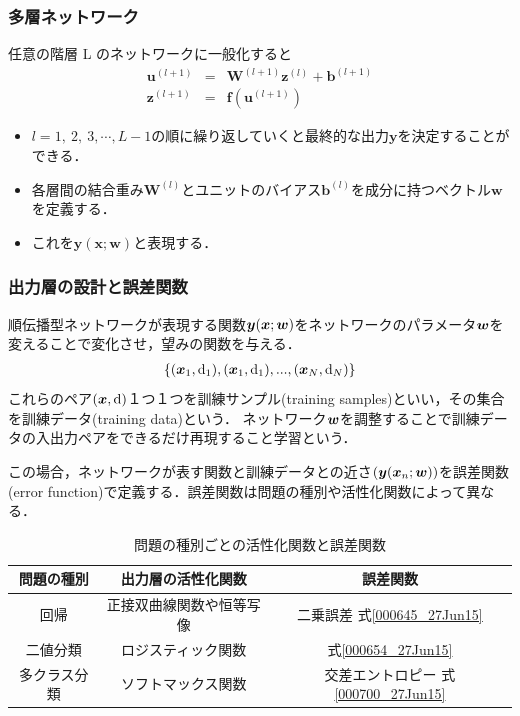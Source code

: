 \documentclass[dvipdfmx,11pt,notheorems]{beamer}
\theoremstyle{definition}
\def\vec#1{\mbox{\boldmath$#1$}}
\begin{document}

\begin{frame}[fragile]\frametitle{多層ネットワーク}

\begin{block}{任意の階層 L のネットワークに一般化すると}
\begin{eqnarray}
  \bm{u}^{(l+1)} &=& \bm{W}^{(l+1)}\bm{z}^{(l)} + \bm{b}^{(l+1)} \nonumber\\
  \bm{z}^{(l+1)} &=& \bm{f}(\bm{u}^{(l+1)}) \nonumber
\end{eqnarray}
\vspace{0.1mm}
\end{block}

\begin{itemize}
\item $l=1,\ 2,\ 3,\cdots, L-1$の順に繰り返していくと最終的な出力$\bm{y}$を決定することができる．
\item 各層間の結合重み$\bm{W}^{(l)}$とユニットのバイアス$\bm{b}^{(l)}$を成分に持つベクトル$\bm{w}$を定義する．\\
\item これを$\bm{y}(\bm{x};\bm{w})$と表現する．
\end{itemize}
\end{frame}


\begin{frame}[fragile]\frametitle{出力層の設計と誤差関数}

順伝播型ネットワークが表現する関数$\vec{y}(\vec{x};\vec{w})$をネットワークのパラメータ$\vec{w}$を変えることで変化させ，望みの関数を与える．
\begin{eqnarray}
 \{(\vec{x}_{1},\mathrm{d}_{1}),(\vec{x}_{1},\mathrm{d}_{1}),...,(\vec{x}_{N},\mathrm{d}_{N})\}
\end{eqnarray}
これらのペア$(\vec{x},\mathrm{d})$１つ１つを訓練サンプル(training samples)といい，その集合を訓練データ(training data)という．
ネットワーク$\vec{w}$を調整することで訓練データの入出力ペアをできるだけ再現すること学習という．

この場合，ネットワークが表す関数と訓練データとの近さ$(\vec{y}(\vec{x}_{n};\vec{w}))$を誤差関数(error function)で定義する．誤差関数は問題の種別や活性化関数によって異なる．

\begin{table}[htb]
\centering
\caption{問題の種別ごとの活性化関数と誤差関数}
\label{000718_27Jun15}
\begin{tabular}[bt]{|c|c|c|}\hline
 問題の種別& 出力層の活性化関数&誤差関数 \\ \hline \hline
 回帰&正接双曲線関数や恒等写像 & 二乗誤差 式\eqref{000645_27Jun15}\\
 二値分類& ロジスティック関数& 式\eqref{000654_27Jun15}\\
 多クラス分類& ソフトマックス関数& 交差エントロピー 式\eqref{000700_27Jun15}\\ \hline
\end{tabular}
\end{table}
\end{frame}
\end{document}
